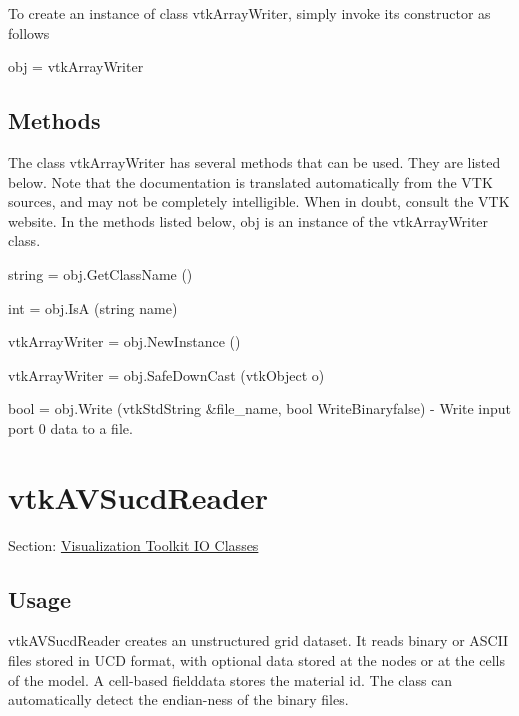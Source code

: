 To create an instance of class vtk\-Array\-Writer, simply invoke its constructor as follows \begin{DoxyVerb}  obj = vtkArrayWriter
\end{DoxyVerb}
 \hypertarget{vtkwidgets_vtkxyplotwidget_Methods}{}\subsection{Methods}\label{vtkwidgets_vtkxyplotwidget_Methods}
The class vtk\-Array\-Writer has several methods that can be used. They are listed below. Note that the documentation is translated automatically from the V\-T\-K sources, and may not be completely intelligible. When in doubt, consult the V\-T\-K website. In the methods listed below, {\ttfamily obj} is an instance of the vtk\-Array\-Writer class. 
\begin{DoxyItemize}
\item {\ttfamily string = obj.\-Get\-Class\-Name ()}  
\item {\ttfamily int = obj.\-Is\-A (string name)}  
\item {\ttfamily vtk\-Array\-Writer = obj.\-New\-Instance ()}  
\item {\ttfamily vtk\-Array\-Writer = obj.\-Safe\-Down\-Cast (vtk\-Object o)}  
\item {\ttfamily bool = obj.\-Write (vtk\-Std\-String \&file\-\_\-name, bool Write\-Binaryfalse)} -\/ Write input port 0 data to a file.  
\end{DoxyItemize}\hypertarget{vtkio_vtkavsucdreader}{}\section{vtk\-A\-V\-Sucd\-Reader}\label{vtkio_vtkavsucdreader}
Section\-: \hyperlink{sec_vtkio}{Visualization Toolkit I\-O Classes} \hypertarget{vtkwidgets_vtkxyplotwidget_Usage}{}\subsection{Usage}\label{vtkwidgets_vtkxyplotwidget_Usage}
vtk\-A\-V\-Sucd\-Reader creates an unstructured grid dataset. It reads binary or A\-S\-C\-I\-I files stored in U\-C\-D format, with optional data stored at the nodes or at the cells of the model. A cell-\/based fielddata stores the material id. The class can automatically detect the endian-\/ness of the binary files.

